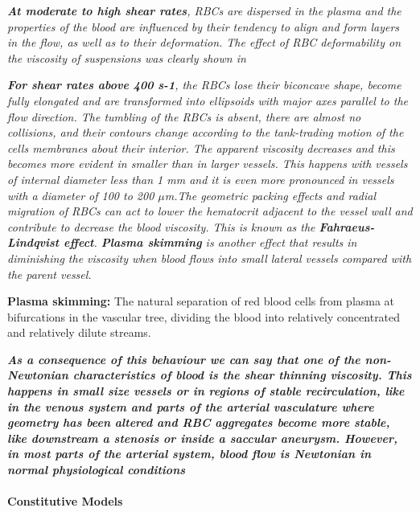 \documentclass[11pt,letterpaper]{article}
\begin{document}
\textit{\textbf{{\color{blue}At moderate to high shear rates}}, RBCs are dispersed in the plasma and the properties of the blood
are influenced by their tendency to align and form layers in the flow, as well as to their deformation. The effect of RBC deformability on the viscosity of suspensions was clearly shown in}

\textit{\textbf{{\color{blue}For shear rates above 400 s-1}}, the RBCs lose their biconcave shape, become fully elongated and are transformed into ellipsoids with major axes parallel to the flow direction. The tumbling of the RBCs is absent, there are almost no collisions, and their contours change according to the tank-trading motion of the cells membranes about their interior. The apparent viscosity decreases and this becomes more evident in smaller than in larger vessels. This happens with vessels of internal diameter less than 1 mm and it is even more pronounced in vessels with a diameter of 100 to 200 $\mu$m.The geometric packing effects and radial migration of RBCs can act to lower the hematocrit adjacent to the vessel wall and contribute to decrease the blood viscosity. This is known as the \textbf{Fahraeus-Lindqvist effect}. \textbf{Plasma skimming} is another effect that results in diminishing the viscosity when blood flows into small lateral vessels compared with the parent vessel.}

\textbf{Plasma skimming:} The natural separation of red blood cells from plasma at bifurcations in the vascular tree, dividing the blood into relatively concentrated and relatively dilute streams.

\textbf{\textit{As a consequence of this behaviour we can say that one of the non-Newtonian characteristics of blood
is the shear thinning viscosity. This happens in small size vessels or in regions of stable recirculation, like in the venous system and parts of the arterial vasculature where geometry has been altered and RBC aggregates become more stable, like downstream a stenosis or inside a saccular aneurysm. However, in most parts of the arterial system, blood flow is Newtonian in normal physiological conditions}}

\paragraph{Constitutive Models}
\end{document}
